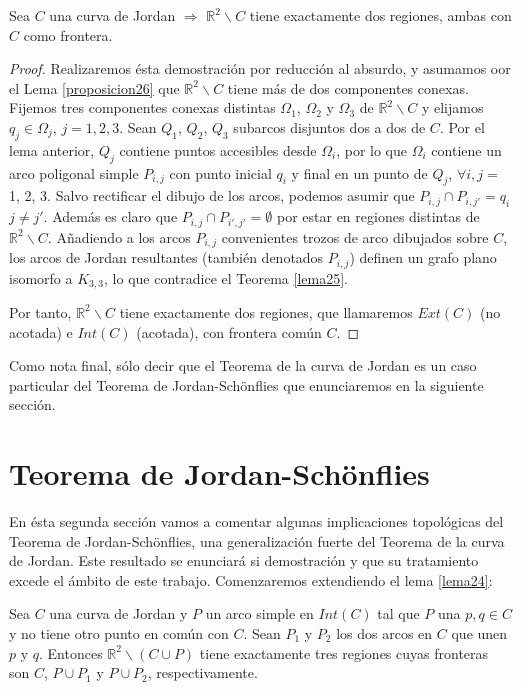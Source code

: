 \begin{theorem}
	Sea $C$ una curva de Jordan $\Rightarrow$ $\mathbb{R}^2 \backslash C$ tiene exactamente dos regiones, ambas con $C$ como frontera.
\end{theorem}

\begin{proof}
Realizaremos ésta demostración por reducción al absurdo, y asumamos oor el Lema \ref{proposicion26}  que $\mathbb{R}^2 \backslash C$ tiene más de dos componentes conexas. Fijemos  tres componentes conexas distintas $\Omega_1$, $\Omega_2$ y $\Omega_3$ de $\mathbb{R}^2 \backslash C$ y elijamos $q_j\in \Omega_j$, $j=1,2,3$.
Sean $Q_1$, $Q_2$, $Q_3$ subarcos disjuntos dos a dos de $C$. 	 Por el lema anterior, $Q_j$ contiene puntos accesibles desde $\Omega_i$, por lo que $\Omega_i$ contiene un arco poligonal simple $P_{i,j}$ con punto inicial $q_i$ y final en un punto de $Q_j$,  $\forall i,j =$ 1, 2, 3. Salvo rectificar el dibujo de los arcos, podemos asumir que $P_{i,j} \cap P_{i,j'} = {q_i}$ $j \neq j'$. Además es claro que $P_{i,j} \cap P_{i',j'} = \emptyset$ por estar en regiones distintas de $\mathbb{R}^2 \backslash C$.
Añadiendo a los arcos $P_{i,j}$ convenientes trozos de arco  dibujados sobre $C$,  los arcos de Jordan resultantes (también denotados $P_{i,j}$) definen un grafo plano isomorfo a $K_{3,3}$, lo que contradice el Teorema \ref{lema25}.

Por tanto, $\mathbb{R}^2 \backslash C$ tiene exactamente dos regiones,  que llamaremos  $Ext(C)$ (no acotada) e $Int(C)$ (acotada), con frontera común $C$.
\end{proof}

Como nota final, sólo decir que el Teorema de la curva de Jordan es un caso particular del Teorema de Jordan-Schönflies que enunciaremos en la siguiente sección.

\section{Teorema de Jordan-Schönflies}

En ésta segunda sección vamos a comentar algunas implicaciones topológicas del Teorema de Jordan-Schönflies, una generalización fuerte del Teorema de la curva de Jordan. Este resultado  se enunciará si demostración y que su tratamiento excede el ámbito de este trabajo. 
Comenzaremos extendiendo el lema \ref{lema24}:

\begin{lemma}
	Sea $C$ una curva de Jordan y $P$ un arco   simple en $Int(C)$ tal que $P$ una $p,q \in C$ y no tiene otro punto en común con $C$. Sean $P_1$ y $P_2$ los dos arcos en $C$ que unen $p$ y $q$. Entonces $\mathbb{R}^2 \backslash (C \cup P)$ tiene exactamente tres regiones cuyas fronteras son $C$, $P\cup P_1$ y $P\cup P_2$, respectivamente.
\end{lemma}

